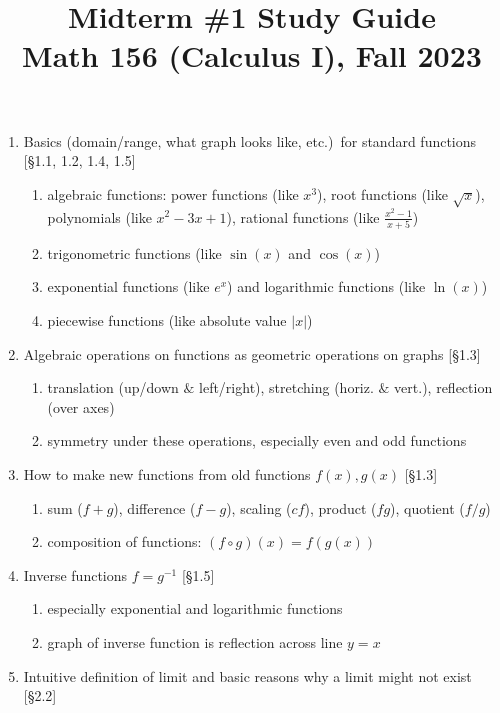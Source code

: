 \documentclass[11pt]{article}
\title{Midterm \#1 Study Guide \\ Math 156 (Calculus I), Fall 2023}
\date{}
\begin{document}
\maketitle

\thispagestyle{empty}

\vspace{-1.5cm}

\begin{enumerate}
\item Basics (domain/range, what graph looks like, etc.)~for standard functions [\S1.1, 1.2, 1.4, 1.5]
\begin{enumerate}
\item algebraic functions: power functions (like $x^3$), root functions (like $\sqrt{x}$), \\ polynomials (like $x^2-3x+1$), rational functions (like $\frac{x^2-1}{x+5}$)
\item trigonometric functions (like $\sin(x)$ and $\cos(x)$)
\item exponential functions (like $e^x$) and logarithmic functions (like $\ln(x)$)
\item piecewise functions (like absolute value $|x|$)
\end{enumerate}
\item Algebraic operations on functions as geometric operations on graphs [\S1.3]
\begin{enumerate}
\item translation (up/down $\&$ left/right), stretching (horiz. $\&$ vert.), reflection (over axes)
\item symmetry under these operations, especially even and odd functions
\end{enumerate}
\item How to make new functions from old functions $f(x), g(x)$ [\S1.3]
\begin{enumerate}
\item sum ($f+g$), difference ($f-g$), scaling ($cf$), product ($fg$), quotient ($f/g$)
\item composition of functions: $(f \circ g)(x) = f(g(x))$
\end{enumerate}
\item Inverse functions $f=g^{-1}$ [\S1.5]
\begin{enumerate}
\item especially exponential and logarithmic functions
\item graph of inverse function is reflection across line $y=x$
\end{enumerate}
\item Intuitive definition of limit and basic reasons why a limit might not exist [\S2.2]

\end{enumerate}
\end{document}
